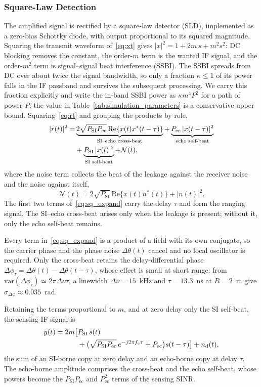 \documentclass[10pt,journal,comsoc]{IEEEtran}
\begin{document}
\subsubsection{Square-Law Detection}
The amplified signal is rectified by a square-law detector (SLD),
implemented as a zero-bias Schottky diode, with output proportional to
its squared magnitude. Squaring the transmit waveform
of~\eqref{eq:xt} gives $|x|^2=1+2m\,s+m^2s^2$: DC blocking removes the
constant, the order-$m$ term is the wanted IF signal, and the
order-$m^2$ term is signal--signal beat interference (SSBI). The SSBI
spreads from DC over about twice the signal bandwidth, so only a
fraction $\kappa\le1$ of its power falls in the IF passband and
survives the subsequent processing. We carry this fraction explicitly
and write the in-band SSBI power as $\kappa m^4P^2$ for a path of power
$P$; the value in Table~\ref{tab:simulation_parameters} is a
conservative upper bound. Squaring~\eqref{eq:rt} and
grouping the products by role,
\begin{align}
|r(t)|^{2}=&\underbrace{2\sqrt{P_{\mathrm{SI}}P_{\mathrm{ec}}}\,
\mathrm{Re}\{x(t)x^{*}(t-\tau)\}}_{\text{SI--echo cross-beat}}
+\underbrace{P_{\mathrm{ec}}\,|x(t-\tau)|^{2}}_{\text{echo self-beat}}
\notag\\
&+\underbrace{P_{\mathrm{SI}}\,|x(t)|^{2}}_{\text{SI self-beat}}
+\mathcal N(t),
\label{eq:sq_expand}
\end{align}
where the noise term collects the beat of the leakage against the
receiver noise and the noise against itself,
\begin{equation}
\mathcal N(t)=2\sqrt{P_{\mathrm{SI}}}\,\mathrm{Re}\{x(t)n^*(t)\}
+|n(t)|^2.
\label{eq:noise}
\end{equation}
The first two terms of~\eqref{eq:sq_expand} carry the delay $\tau$ and
form the ranging signal. The SI--echo cross-beat arises only when the
leakage is present; without it, only the echo self-beat remains.

Every term in~\eqref{eq:sq_expand} is a product of a field with its own
conjugate, so the carrier phase and the phase noise $\Delta\theta(t)$
cancel and no local oscillator is required. Only the cross-beat retains
the delay-differential phase
$\Delta\phi_\tau=\Delta\theta(t)-\Delta\theta(t-\tau)$, whose effect is
small at short range: from
$\mathrm{var}(\Delta\phi_\tau)\simeq2\pi\Delta\nu\tau$, a linewidth
$\Delta\nu=15$~kHz and $\tau=13.3$~ns at $R=2$~m give
$\sigma_{\Delta\phi}\approx0.035$~rad.

Retaining the terms proportional to $m$, and at zero delay only the SI
self-beat, the sensing IF signal is
\begin{align}
y(t)=2m\big[&P_{\mathrm{SI}}\,s(t)\notag\\
&+\big(\sqrt{P_{\mathrm{SI}}P_{\mathrm{ec}}}\,e^{-j2\pi f_c\tau}
+P_{\mathrm{ec}}\big)s(t-\tau)\big]+n_{\mathrm{d}}(t),
\label{eq:yt}
\end{align}
the sum of an SI-borne copy at zero delay and an echo-borne copy at
delay $\tau$. The echo-borne amplitude comprises the cross-beat and the
echo self-beat, whose powers become the
$P_{\mathrm{SI}}P_{\mathrm{ec}}$ and $P_{\mathrm{ec}}^2$ terms of the
sensing SINR.
\end{document}
